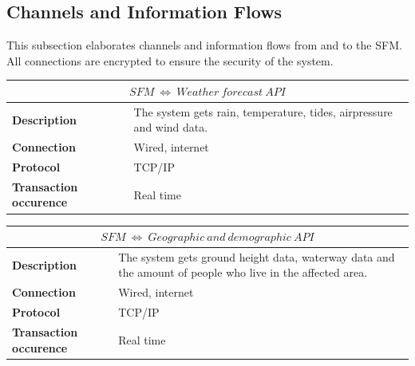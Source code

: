 \subsection{Channels and Information Flows}
\label{subsec:channels-information-flows}
This subsection elaborates channels and information flows from and to the \gls{SFM}. All connections are encrypted to ensure the security of the system.

\begin{table}[H]
	\centering
	\begin{tabular}{L{} L{}}
		\toprule
		 \\ \midrule
		\textbf{Description}           & The system gets rain, temperature, tides, airpressure and wind data. \\
		\textbf{Connection}            & Wired, internet                                                      \\
		\textbf{Protocol}              & TCP/IP                                                               \\
		\textbf{Transaction occurence} & Real time                                                            \\
		\bottomrule
	\end{tabular}
\end{table}

\begin{table}[H]
	\centering
	\begin{tabular}{L{} L{}}
		\toprule
		 \\ \midrule
		\textbf{Description}           & The system gets ground height data, waterway data and the amount of people who live in the affected area. \\
		\textbf{Connection}            & Wired, internet                                                                                           \\
		\textbf{Protocol}              & TCP/IP                                                                                                    \\
		\textbf{Transaction occurence} & Real time                                                                                                 \\
		\bottomrule
	\end{tabular}
\end{table}

